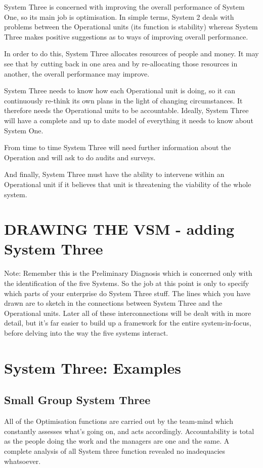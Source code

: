 System Three is concerned with improving the overall performance of System One, so its main job is optimisation. In simple terms, System 2 deals with problems between the Operational units (its function is stability) whereas System Three makes positive suggestions as to ways of improving overall performance.

In order to do this, System Three allocates resources of people and money. It may see that by cutting back in one area and by re-allocating those resources in another, the overall performance may improve.

System Three needs to know how each Operational unit is doing, so it can continuously re-think its own plans in the light of changing circumstances. It therefore needs the Operational units to be accountable. Ideally, System Three will have a complete and up to date model of everything it needs to know about System One.

From time to time System Three will need further information about the Operation and will ask to do audits and surveys.

And finally, System Three must have the ability to intervene within an Operational unit if it believes that unit is threatening the viability of the whole system.

\section*{DRAWING THE VSM - adding System Three}
Note: Remember this is the Preliminary Diagnosis which is concerned only with the identification of the five Systems. So the job at this point is only to specify which parts of your enterprise do System Three stuff. The lines which you have drawn are to sketch in the connections between System Three and the Operational units. Later all of these interconnections will be dealt with in more detail, but it's far easier to build up a framework for the entire system-in-focus, before delving into the way the five systems interact.

\section*{System Three: Examples}

\subsection*{Small Group System Three}
All of the Optimisation functions are carried out by the team-mind which constantly assesses what's going on, and acts accordingly. Accountability is total as the people doing the work and the managers are one and the same. A complete analysis of all System three function revealed no inadequacies whatsoever.


